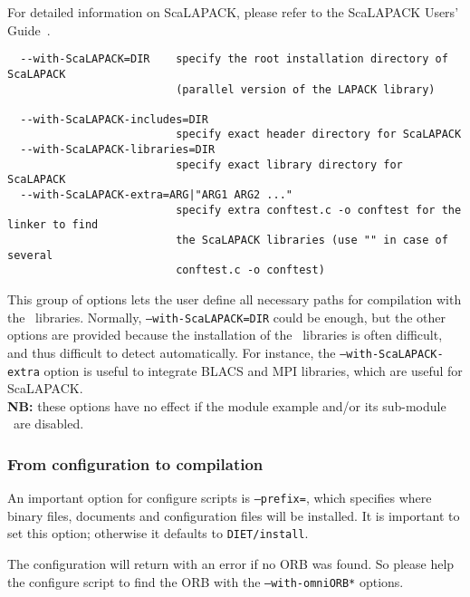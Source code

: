 For detailed information on ScaLAPACK, please refer to the ScaLAPACK
Users' Guide~\cite{BCC+97}.


{\footnotesize
\begin{verbatim}
  --with-ScaLAPACK=DIR    specify the root installation directory of ScaLAPACK
                          (parallel version of the LAPACK library)

  --with-ScaLAPACK-includes=DIR
                          specify exact header directory for ScaLAPACK
  --with-ScaLAPACK-libraries=DIR
                          specify exact library directory for ScaLAPACK
  --with-ScaLAPACK-extra=ARG|"ARG1 ARG2 ..."
                          specify extra conftest.c -o conftest for the linker to find 
                          the ScaLAPACK libraries (use "" in case of several 
                          conftest.c -o conftest)
\end{verbatim}
}

\noindent This group of options lets the user define all necessary
paths for compilation with the \scalapack\ libraries. Normally,
\texttt{--with-ScaLAPACK=DIR} could be enough, but the other options
are provided because the installation of the \scalapack\ libraries is
often difficult, and thus difficult to detect automatically. For
instance, the \texttt{--with-ScaLAPACK-extra} option is useful to
integrate BLACS and MPI libraries, which are useful for ScaLAPACK.  \\
\textbf{NB:} these options have no effect if the module example and/or
its sub-module \scalapack\ are disabled.

\subsubsection{From configuration to compilation}

An important option for configure scripts is \texttt{--prefix=}, which
specifies where binary files, documents and configuration files will
be installed. It is important to set this option; otherwise it 
defaults to \texttt{DIET/install}.

The configuration will return with an error if no ORB was found. So
please help the configure script to find the ORB with the
\texttt{--with-omniORB*} options.\\


